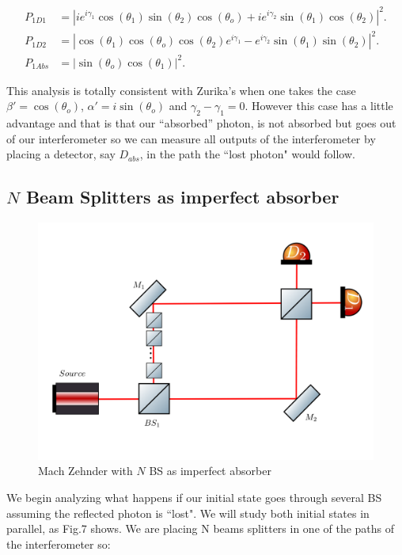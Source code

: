 \documentclass[12pt]{article}
\begin{document}
\begin{align}
P_{1D1}&=|ie^{i\gamma_{1}}\cos(\theta_{1})\sin(\theta_{2})\cos(\theta_{o})+i e^{i\gamma_{2}}\sin(\theta_{1})\cos(\theta_{2})|^2. \\
P_{1D2}&=|\cos(\theta_{1})\cos(\theta_{o})\cos(\theta_{2})e^{i\gamma_{1}}-e^{i\gamma_{2}} \sin(\theta_{1})\sin(\theta_{2})|^2.\\
P_{1Abs}&=|\sin(\theta_{o}) \cos(\theta_{1})|^2.
\end{align}


This analysis is totally consistent with Zurika's \cite{zuri} when one takes the case $\beta'=\cos(\theta_{o})$, $\alpha'=i \sin(\theta_{o})$ and $\gamma_{2}-\gamma_{1}=0$. However this case has a little advantage and that is that our ``absorbed'' photon, is not absorbed but goes out of our interferometer so we can measure all outputs of the interferometer by placing a detector, say $D_{abs}$, in the path the ``lost photon" would follow.

\subsection{$N$ Beam Splitters as imperfect absorber }
\vspace{1 cm}


\begin{figure}[hbt!]
\centering
\includegraphics[width=\linewidth,height=8 cm]{images/machzenhderBSS.png}
\caption{Mach Zehnder with $N$ BS as imperfect absorber}
\label{fig:BS2}
\end{figure}


We begin analyzing what happens if our initial state goes through several BS assuming the reflected photon is ``lost". We will study both initial states in parallel, as Fig.7 shows. We are placing N beams splitters in one of the paths of the interferometer so:
\end{document}
